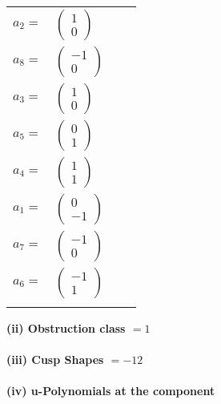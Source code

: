 \documentclass[1p]{elsarticle_modified}
\theoremstyle{definition}
\begin{document}
\begin{tabular}{m{7pt} m{180pt} m{7pt} m{180pt} }
\flushright $a_{2}=$&$\begin{pmatrix}1\\0\end{pmatrix}$ \\
\flushright $a_{8}=$&$\begin{pmatrix}-1\\0\end{pmatrix}$ \\
\flushright $a_{3}=$&$\begin{pmatrix}1\\0\end{pmatrix}$ \\
\flushright $a_{5}=$&$\begin{pmatrix}0\\1\end{pmatrix}$ \\
\flushright $a_{4}=$&$\begin{pmatrix}1\\1\end{pmatrix}$ \\
\flushright $a_{1}=$&$\begin{pmatrix}0\\-1\end{pmatrix}$ \\
\flushright $a_{7}=$&$\begin{pmatrix}-1\\0\end{pmatrix}$ \\
\flushright $a_{6}=$&$\begin{pmatrix}-1\\1\end{pmatrix}$\\&\end{tabular}
\flushleft \textbf{(ii) Obstruction class $= 1$}\\~\\
\flushleft \textbf{(iii) Cusp Shapes $= -12$}\\~\\
\newpage\renewcommand{\arraystretch}{1}
\flushleft \textbf{(iv) u-Polynomials at the component}\newline \\
\end{document}
